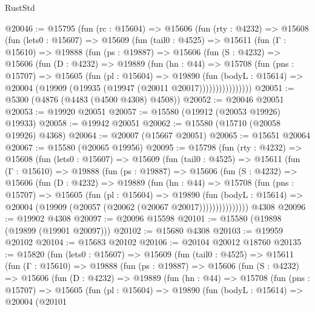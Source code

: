 \begin{lexlean}{RustStd}
\begin{coremodule}
@20046 := @15795
    (fun (rc : @15604) =>
    @15606
      (fun (rty : @4232) =>
      @15608
        (fun (lets0 : @15607) =>
        @15609
          (fun (tail0 : @4525) =>
          @15611
            (fun (Γ : @15610) =>
            @19888
              (fun (ps : @19887) =>
              @15606
                (fun (S : @4232) =>
                @15606
                  (fun (D : @4232) =>
                  @19889
                    (fun (hn : @44) =>
                    @15708
                      (fun (pns : @15707) =>
                      @15605
                        (fun (pl : @15604) =>
                        @19890
                          (fun (bodyL : @15614) =>
                          @20004 (@19909 (@19935 (@19947 (@20011 @20017))))))))))))))))
@20051 := @5300 (@4876 (@4483 (@4500 @4308) @4508))
@20052 := @20046 @20051
@20053 := @19920 @20051
@20057 := @15580 (@19912 (@20053 @19926) @19933)
@20058 := @19942 @20051
@20062 := @15580 (@15710 (@20058 @19926) @4368)
@20064 := @20007 (@15667 @20051)
@20065 := @15651 @20064
@20067 := @15580 (@20065 @19956)
@20095 := @15798
    (fun (rty : @4232) =>
    @15608
      (fun (lets0 : @15607) =>
      @15609
        (fun (tail0 : @4525) =>
        @15611
          (fun (Γ : @15610) =>
          @19888
            (fun (ps : @19887) =>
            @15606
              (fun (S : @4232) =>
              @15606
                (fun (D : @4232) =>
                @19889
                  (fun (hn : @44) =>
                  @15708
                    (fun (pns : @15707) =>
                    @15605
                      (fun (pl : @15604) =>
                      @19890
                        (fun (bodyL : @15614) =>
                        @20004 (@19909 (@20057 (@20062 (@20067 @20017)))))))))))))))
    @4308
@20096 := @19902 @4308
@20097 := @20096 @15598
@20101 := @15580 (@19898 (@19899 (@19901 @20097)))
@20102 := @15680 @4308
@20103 := @19959 @20102
@20104 := @15683 @20102
@20106 := @20104 @20012 @18760
@20135 := @15820
    (fun (lets0 : @15607) =>
    @15609
      (fun (tail0 : @4525) =>
      @15611
        (fun (Γ : @15610) =>
        @19888
          (fun (ps : @19887) =>
          @15606
            (fun (S : @4232) =>
            @15606
              (fun (D : @4232) =>
              @19889
                (fun (hn : @44) =>
                @15708
                  (fun (pns : @15707) =>
                  @15605
                    (fun (pl : @15604) =>
                    @19890
                      (fun (bodyL : @15614) =>
                      @20004
                        (@20101

\end{coremodule}
\end{lexlean}
